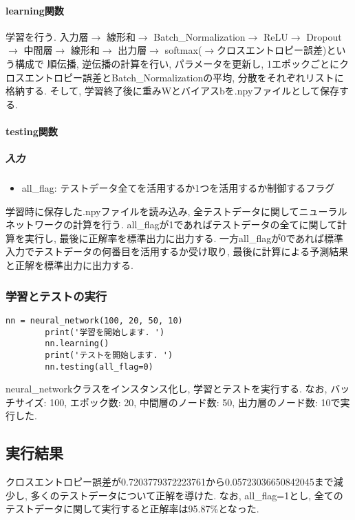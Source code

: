 \documentclass[a4j, titlepage]{jarticle}
\begin{document}
        \paragraph*{learning関数}
            学習を行う.
            入力層$\rightarrow$
            線形和$\rightarrow$
            Batch\_Normalization$\rightarrow$
            ReLU$\rightarrow$
            Dropout$\rightarrow$
            中間層$\rightarrow$
            線形和$\rightarrow$
            出力層$\rightarrow$
            softmax($\rightarrow$クロスエントロピー誤差)という構成で
            順伝播, 逆伝播の計算を行い, パラメータを更新し,
            1エポックごとにクロスエントロピー誤差とBatch\_Normalizationの平均, 分散をそれぞれリストに格納する.
            そして, 学習終了後に重みWとバイアスbを.npyファイルとして保存する.
        \paragraph*{testing関数}
            \subparagraph*{入力}
            \begin{itemize}
                \item all\_flag: テストデータ全てを活用するか1つを活用するか制御するフラグ
            \end{itemize}
            学習時に保存した.npyファイルを読み込み, 全テストデータに関してニューラルネットワークの計算を行う.
            all\_flagが1であればテストデータの全てに関して計算を実行し, 最後に正解率を標準出力に出力する. 一方all\_flagが0であれば標準入力でテストデータの何番目を活用するか受け取り, 最後に計算による予測結果と正解を標準出力に出力する.

    \subsubsection*{学習とテストの実行}
        \begin{lstlisting}[caption=学習とテストの実行,label=fuga]
        nn = neural_network(100, 20, 50, 10)
        print('学習を開始します. ')
        nn.learning()
        print('テストを開始します. ')
        nn.testing(all_flag=0)
        \end{lstlisting}
        neural\_networkクラスをインスタンス化し, 学習とテストを実行する.
        なお, バッチサイズ: 100, エポック数: 20, 中間層のノード数: 50, 出力層のノード数: 10で実行した.

\subsection*{実行結果}
クロスエントロピー誤差が0.7203779372223761から0.05723036650842045まで減少し,
多くのテストデータについて正解を導けた. なお, all\_flag=1とし, 全てのテストデータに関して実行すると正解率は95.87\%となった.
\end{document}
